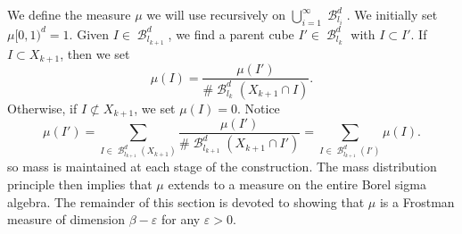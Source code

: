\documentclass[dvipsnames,letterpaper,12pt]{article}
\numberwithin{equation}{section}
\theoremstyle{plain}
\DeclareMathOperator{\B}{\mathcal{B}}
\begin{document}
We define the measure $\mu$ we will use recursively on $\bigcup_{i = 1}^\infty \B^d_{l_i}$. We initially set $\mu [0,1)^d = 1$. Given $I \in \B^d_{l_{k+1}}$, we find a parent cube $I' \in \B^d_{l_k}$ with $I \subset I'$. If $I \subset X_{k+1}$, then we set
%
\[ \mu(I) = \frac{\mu(I')}{\# \B^d_{l_k}(X_{k+1} \cap I)}. \]
%
Otherwise, if $I \not \subset X_{k+1}$, we set $\mu(I) = 0$. Notice
%
\[ \mu(I') = \sum_{I \in \B^d_{l_{k+1}}(X_{k+1})} \frac{\mu(I')}{\# \B^d_{l_{k+1}}(X_{k+1} \cap I')} = \sum_{I \in \B^d_{l_{k+1}}(I')} \mu(I). \]
%
so mass is maintained at each stage of the construction. The mass distribution principle then implies that $\mu$ extends to a measure on the entire Borel sigma algebra.
%
%
%
The remainder of this section is devoted to showing that $\mu$ is a Frostman measure of dimension $\beta - \varepsilon$ for any $\varepsilon > 0$.

\end{document}
